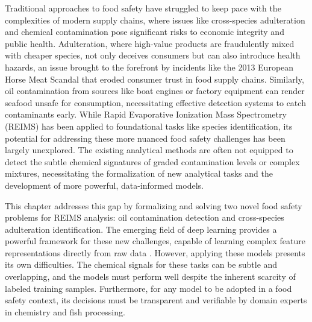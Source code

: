 Traditional approaches to food safety have struggled to keep pace with the complexities of modern supply chains, where issues like cross-species adulteration and chemical contamination pose significant risks to economic integrity and public health. Adulteration, where high-value products are fraudulently mixed with cheaper species, not only deceives consumers but can also introduce health hazards, an issue brought to the forefront by incidents like the 2013 European Horse Meat Scandal \citep{Premanandh2013} that eroded consumer trust in food supply chains. Similarly, oil contamination from sources like boat engines or factory equipment \citep{Moens2003} can render seafood unsafe for consumption, necessitating effective detection systems to catch contaminants early. While Rapid Evaporative Ionization Mass Spectrometry (REIMS) \citep{Schaefer2009} has been applied to foundational tasks like species identification, its potential for addressing these more nuanced food safety challenges has been largely unexplored. The existing analytical methods are often not equipped to detect the subtle chemical signatures of graded contamination levels or complex mixtures, necessitating the formalization of new analytical tasks and the development of more powerful, data-informed models.

This chapter addresses this gap by formalizing and solving two novel food safety problems for REIMS analysis: oil contamination detection and cross-species adulteration identification. The emerging field of deep learning provides a powerful framework for these new challenges, capable of learning complex feature representations directly from raw data \citep{Goodfellow2016}. However, applying these models presents its own difficulties. The chemical signals for these tasks can be subtle and overlapping, and the models must perform well despite the inherent scarcity of labeled training samples. Furthermore, for any model to be adopted in a food safety context, its decisions must be transparent and verifiable by domain experts in chemistry and fish processing.

